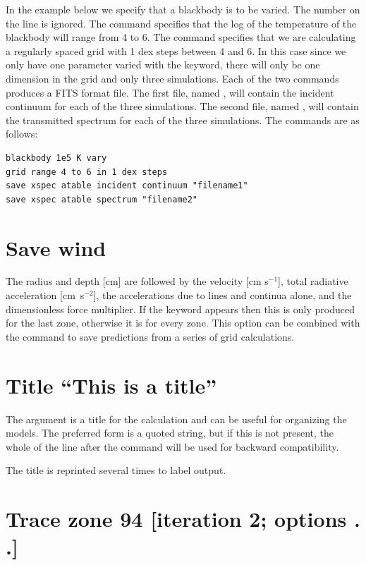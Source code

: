 In the example below we specify that a blackbody is to be varied.
The
number on the  line is ignored.
The  command specifies that
the log of the temperature of the blackbody will range from 4 to 6.
The
 command specifies that we are calculating
a regularly spaced grid with 1 dex steps between 4 and 6.
In this case
since we only have one parameter varied with the  keyword, there will
only be one dimension in the grid and only three simulations.
Each of the
two  commands produces a FITS format file.  The first
file, named , will contain the incident continuum for each of the
three simulations.
The second file, named , will contain the
transmitted spectrum for each of the three simulations.
The commands are as follows:
\begin{verbatim}
blackbody 1e5 K vary
grid range 4 to 6 in 1 dex steps
save xspec atable incident continuum "filename1"
save xspec atable spectrum "filename2"
\end{verbatim}

\section{Save wind}

The radius and depth [cm] are followed by the velocity [cm s$^{-1}$],
total radiative acceleration [cm~s$^{-2}$],
the accelerations due to lines and continua
alone, and the dimensionless force multiplier.
If the keyword
appears then this is only produced for the last zone, otherwise it is for
every zone.
This option can be combined with the  command
to save predictions from a series of grid calculations.

\section{Title ``This is a title''}

The argument is a title for the calculation and can be useful for
organizing the models.  The preferred form is a quoted string, but if
this is not present, the whole of the line after the command will be
used for backward compatibility.

The title is reprinted several times to label output.

\section{Trace zone 94 [iteration 2; options . .]}

